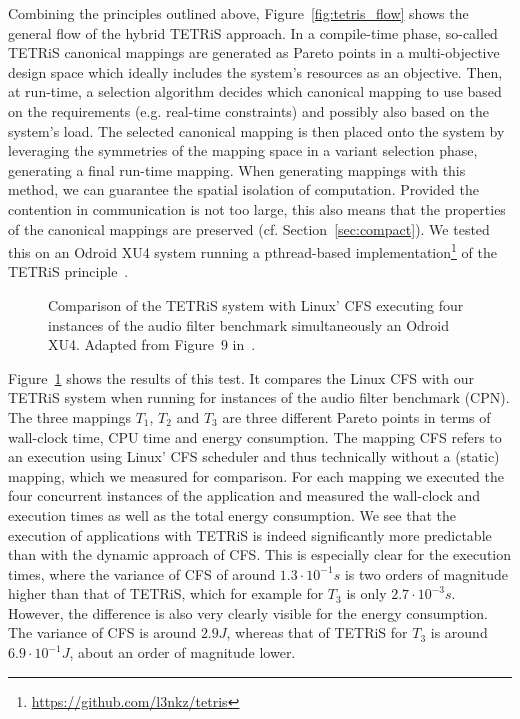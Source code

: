 Combining the principles outlined above, Figure~\ref{fig:tetris_flow} shows the general flow of the hybrid \ac{TETRiS} approach. 
In a compile-time phase, so-called \ac{TETRiS} canonical mappings are generated as Pareto points in a multi-objective design space which ideally includes the system's resources as an objective.
Then, at run-time, a selection algorithm decides which canonical mapping to use based on the requirements (e.g. real-time constraints) and possibly also based on the system's load.
The selected canonical mapping is then placed onto the system by leveraging the symmetries of the mapping space in a variant selection phase, generating a final run-time mapping.
When generating mappings with this method, we can guarantee the spatial isolation of computation.
Provided the contention in communication is not too large, this also means that the properties of the canonical mappings are preserved (cf. Section~\ref{sec:compact}).
We tested this on an Odroid XU4 system running a pthread-based implementation\footnote{\url{https://github.com/l3nkz/tetris}} of the \ac{TETRiS} principle~\cite{goens_scopes17}.

\begin{figure}[th]
	\centering
	\caption{Comparison of the TETRiS system with Linux' \acs*{CFS} executing four instances of the audio filter benchmark simultaneously an Odroid XU4. Adapted from Figure~9 in~\cite{goens_scopes17}.}
	\label{fig:tetris_experiment}
\end{figure}

Figure~\ref{fig:tetris_experiment} shows the results of this test.
It compares the Linux \ac{CFS} with our \ac{TETRiS} system when running for instances of the audio filter benchmark (\ac{CPN}).
The three mappings $T_1$, $T_2$ and $T_3$ are three different Pareto points in terms of wall-clock time, CPU time and energy consumption. 
The mapping \ac{CFS} refers to an execution using Linux' \ac{CFS} scheduler and thus technically without a (static) mapping, which we measured for comparison.
For each mapping we executed the four concurrent instances of the application and measured the wall-clock and execution times as well as the total energy consumption.
We see that the execution of applications with \ac{TETRiS} is indeed significantly more predictable than with the dynamic approach of \ac{CFS}.
This is especially clear for the execution times, where the variance of \ac{CFS} of around $1.3 \cdot 10^{-1} s$ is two orders of magnitude higher than that of \ac{TETRiS}, which for example for $T_3$ is only  $2.7 \cdot 10^{-3}s$.
However, the difference is also very clearly visible for the energy consumption. The variance of \ac{CFS} is around $2.9 J$, whereas that of \ac{TETRiS} for $T_3$ is around $6.9 \cdot 10^{-1} J$, about an order of magnitude lower.

